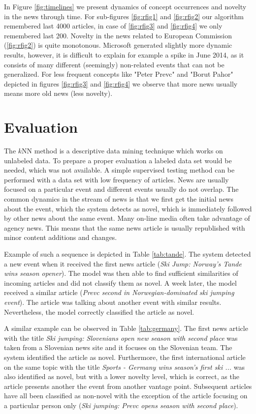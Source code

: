 \documentclass{acm_proc_article-sp}
\begin{document}
In Figure \ref{fig:timelines} we present dynamics of concept occurrences and novelty in the news through time. For sub-figures \ref{fig:rfig1} and \ref{fig:rfig2} our algorithm remembered last 4000 articles, in case of \ref{fig:rfig3} and \ref{fig:rfig4} we only remembered last 200. Novelty in the news related to European Commission (\ref{fig:rfig2}) is quite monotonous. Microsoft generated slightly more dynamic results, however, it is difficult to explain for example a spike in June 2014, as it consists of many different (seemingly) non-related events that can not be generalized. For less frequent concepts like "Peter Prevc" and "Borut Pahor" depicted in figures \ref{fig:rfig3} and \ref{fig:rfig4} we observe that more news usually means more old news (less novelty).

\section{Evaluation}\label{section:evaluation}
The $k$NN method is a descriptive data mining technique which works on unlabeled data. To prepare a proper evaluation a labeled data set would be needed, which was not available. A simple supervised testing method can be performed with a data set with low frequency of articles. News are usually focused on a particular event and different events usually do not overlap. The common dynamics in the stream of news is that we first get the initial news about the event, which the system detects as novel, which is immediately followed by other news about the same event. Many on-line media often take advantage of agency news. This means that the same news article is usually republished with minor content additions and changes.

Example of such a sequence is depicted in Table \ref{tab:tande}. The system detected a new event when it received the first news article (\textit{Ski Jump: Norway's Tande wins season opener}). The model was then able to find sufficient similarities of incoming articles and did not classify them as novel. A week later, the model received a similar article (\textit{Prevc second in Norwegian-dominated ski jumping event}). The article was talking about another event with similar results. Nevertheless, the model correctly classified the article as novel.

A similar example can be observed in Table \ref{tab:germany}. The first news article with the title \textit{Ski jumping: Slovenians open new season with second place} was taken from a Slovenian news site and it focuses on the Slovenian team. The system identified the article as novel. Furthermore, the first international article on the same topic with the title \textit{Sports - Germany wins season's first ski ...} was also identified as novel, but with a lower novelty level, which is correct, as the article presents another the event from another vantage point. Subsequent articles have all been classified as non-novel with the exception of the article focusing on a particular person only (\textit{Ski jumping: Prevc opens season with second place}). 
\end{document}
